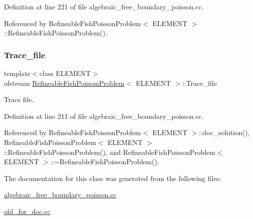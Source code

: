 Definition at line 221 of file algebraic\+\_\+free\+\_\+boundary\+\_\+poisson.\+cc.



Referenced by Refineable\+Fish\+Poisson\+Problem$<$ E\+L\+E\+M\+E\+N\+T $>$\+::\+Refineable\+Fish\+Poisson\+Problem().

\mbox{\label{classRefineableFishPoissonProblem_aa358e2b0fa91780bdca32ae4676717ff}} 
\subsubsection{\texorpdfstring{Trace\+\_\+file}{Trace\_file}}
{\footnotesize\ttfamily template$<$class E\+L\+E\+M\+E\+NT$>$ \\
ofstream \hyperlink{classRefineableFishPoissonProblem}{Refineable\+Fish\+Poisson\+Problem}$<$ E\+L\+E\+M\+E\+NT $>$\+::Trace\+\_\+file\hspace{0.3cm}{\ttfamily [private]}}



Trace file. 



Definition at line 211 of file algebraic\+\_\+free\+\_\+boundary\+\_\+poisson.\+cc.



Referenced by Refineable\+Fish\+Poisson\+Problem$<$ E\+L\+E\+M\+E\+N\+T $>$\+::doc\+\_\+solution(), Refineable\+Fish\+Poisson\+Problem$<$ E\+L\+E\+M\+E\+N\+T $>$\+::\+Refineable\+Fish\+Poisson\+Problem(), and Refineable\+Fish\+Poisson\+Problem$<$ E\+L\+E\+M\+E\+N\+T $>$\+::$\sim$\+Refineable\+Fish\+Poisson\+Problem().



The documentation for this class was generated from the following files\+:\begin{DoxyCompactItemize}
\item 
\hyperlink{algebraic__free__boundary__poisson_8cc}{algebraic\+\_\+free\+\_\+boundary\+\_\+poisson.\+cc}\item 
\hyperlink{old__for__doc_8cc}{old\+\_\+for\+\_\+doc.\+cc}\end{DoxyCompactItemize}
